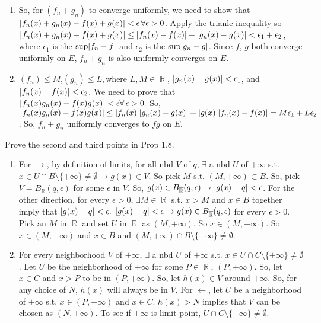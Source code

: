 \documentclass[12pt,letterpaper,boxed]{hmcpset}
\DeclareMathOperator{\R}{\mathbb{R}}
\DeclarePairedDelimiter\abs{\lvert}{\rvert}%
\begin{document}
\begin{solution}
\begin{enumerate}
    \item So, for $(f_n + g_n)$ to converge uniformly, we need to show that $\abs{f_n(x) + g_n(x) - f(x) + g(x)} < \epsilon\, \forall \epsilon > 0$. Apply the trianle inequality so $\abs{f_n(x) + g_n(x) - f(x) + g(x)} \leq \abs{f_n(x) - f(x)} + \abs{g_n(x) - g(x)} < \epsilon_1 + \epsilon_2$, where $\epsilon_1$ is the $\sup \abs{f_n - f}$ and $\epsilon_2$ is the $\sup \abs{g_n - g}$. Since $f$, $g$ both converge uniformly on $E$, $f_n + g_n$ is also uniformly converges on $E$.
    \item $(f_n) \leq M$,$(g_n) \leq L, $where $L, M \in \R$, $\abs{g_n(x) - g(x)} < \epsilon_1$, and $\abs{f_n(x) - f(x)} < \epsilon_2$. We need to prove that $\abs{f_n(x)g_n(x) - f(x)g(x)} < \epsilon \forall \, \epsilon > 0.$ So, $\abs{f_n(x)g_n(x) - f(x)g(x)} \leq \abs{f_n(x)}\abs{g_n(x) - g(x)} + \abs{g(x)}\abs{f_n(x) - f(x)} = M\epsilon_1 + L\epsilon_2$. So, $f_n + g_n$ uniformly converges to $fg$ on $E$.
\end{enumerate}
\end{solution}
\newpage
\begin{problem}[Exercise 1.9]
Prove the second and third points in Prop 1.8.
\end{problem}

\begin{solution}
\begin{enumerate}
    \item For $\rightarrow$, by definition of limits, for all nbd $V$ of $q$, $\exists$ a nbd $U$ of $+\infty$ s.t. $x \in U \cap B\setminus\{+\infty\}\neq\emptyset\rightarrow g(x)\in V.$ So pick $M$ s.t. $(M, +\infty)\subset B.$ So, pick $V = B_{\overline{\R}}(q,\epsilon)$ for some $\epsilon$ in $V$. So, $g(x)\in B_{\overline{\R}}(q,\epsilon) \rightarrow \abs{g(x) - q} < \epsilon$. For the other direction, for every $\epsilon > 0$, $\exists M \in \R$ s.t. $x > M$ and $x \in B$ together imply that $\abs{g(x) - q} < \epsilon.$ $\abs{g(x) - q} < \epsilon \rightarrow g(x) \in B_{\overline{\R}}(q, \epsilon)$ for every $\epsilon > 0.$ Pick an $M$ in $\R$ and set $U$ in $\R$ as  $(M, +\infty)$. So $x \in (M, + \infty)$. So $x\in (M, +\infty)$ and $x\in B$ and $(M,+\infty)\cap B \setminus \{+\infty\}\neq\emptyset.$
    \item For every neighborhood $V$ of $+\infty$, $\exists$ a nbd $U$ of $+\infty$ s.t. $x\in U\cap C \setminus \{+\infty\}\neq\emptyset$. Let $U$ be the neighborhood of $+\infty$ for some $P\in\R$, $(P,+\infty)$. So, let $x\in C$ and $x > P$ to be in $(P, +\infty)$. So, let $h(x)\in V$ around $+\infty$. So, for any choice of $N$, $h(x)$ will always be in $V$. For $\leftarrow$, let $U$ be a neighborhood of $+\infty$ s.t. $x\in (P,+\infty)$ and $x\in C$. $h(x) > N$ implies that $V$ can be chosen as $(N, +\infty)$. To see if $+\infty$ is limit point, $U\cap C \setminus \{+\infty\}\neq \emptyset.$
\end{enumerate}
\end{solution}
\end{document}
